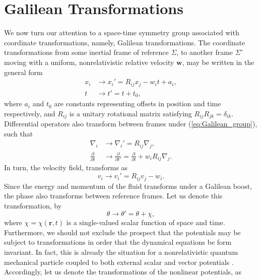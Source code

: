 \documentclass[twocolumn, nofootinbib, nobibnotes, amsmath,amssymb,aps, pra, floatfix]{revtex4-1}
\renewcommand{\v}[1]{\ensuremath{\mathbf{#1}}} %
\newcommand{\pd}[2]{\frac{\partial #1}{\partial #2}} %
\begin{document}
\section{\label{sec:galilean}Galilean Transformations}
We now turn our attention to a space-time symmetry group associated with coordinate transformations, namely, Galilean transformations.
The coordinate transformations from some inertial frame of reference $\Sigma$, to another frame $\Sigma'$ moving with a uniform, nonrelativistic relative velocity $\v{w}$, may be written in the general form \cite{holland1995quantum,arnold2007mathematical,iro2015modern}
\begin{align}
  x_i&\rightarrow x_i'=R_{ij}x_j-w_it+a_i, \nonumber\\
  t&\rightarrow t'=t+t_0, \label{eq:Galilean_group}
\end{align}
where $a_i$ and $t_0$ are constants representing offsets in position and time respectively, and $R_{ij}$ is a unitary rotational matrix satisfying $R_{ij}R_{jk}=\delta_{ik}$.
Differential operators also transform between frames under (\ref{eq:Galilean_group}), such that 
\begin{align}
  \nabla_i&\rightarrow \nabla_i'=R_{ij}\nabla_j, \label{eq:differential_operator_transformation_galilean_space} \\
  \pd{}{t}&\rightarrow \pd{}{t'}=\pd{}{t}+w_iR_{ij}\nabla_j. \label{eq:differential_operator_transformation_galilean_time}
\end{align}
In turn, the velocity field, transforms as
\begin{equation}
  v_i\rightarrow v_i'=R_{ij}v_j-w_i.
  \label{eq:velocity_transformation_galilean}
\end{equation}
Since the energy and momentum of the fluid transforms under a Galilean boost, the phase also transforms between reference frames.
Let us denote this transformation, by
\begin{equation}
    \theta\rightarrow\theta'=\theta+\chi,
  \label{eq:phaseTransformationGalilean}
\end{equation}
where $\chi=\chi\left(\v{r},t\right)$ is a single-valued scalar function of space and time.
Furthermore, we should not exclude the prospect that the potentials may be subject to transformations in order that the dynamical equations be form invariant.
In fact, this is already the situation for a nonrelativistic quantum mechanical particle coupled to both external scalar and vector potentials \cite{takagi1991quantum,dewitt1957dynamical,brown1999galilean}. 
Accordingly, let us denote the transformations of the nonlinear potentials, as 
\end{document}
